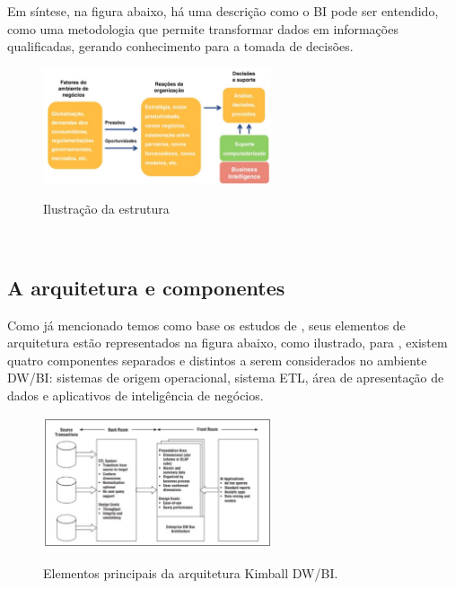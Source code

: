 Em s\'{i}ntese, na figura abaixo, h\'{a} uma descri\c{c}\~{a}o como o BI pode ser entendido, como uma metodologia que permite transformar dados em informa\c{c}\~{o}es qualificadas, gerando conhecimento para a tomada de decis\~{o}es.

\begin{figure}[H]
	\vspace*{0,2cm}
    \centering
    \caption{Ilustra\c{c}\~{a}o da estrutura}
    \includegraphics[width=0.6\textwidth]{./04-figuras/figura-01}
    \label{fig:ilustfig01}
\end{figure}
\vspace*{-0,9cm}
{\raggedright {}}\\

\subsection{A arquitetura e componentes}

Como j\'{a} mencionado temos como base os estudos de \cite{dw-kimball-2013}, seus elementos de arquitetura est\~{a}o representados na figura abaixo, como ilustrado, para \cite{dw-kimball-2013}, existem quatro componentes separados e distintos a serem considerados no ambiente DW/BI: sistemas de origem operacional, sistema ETL, \'{a}rea de apresenta\c{c}\~{a}o de dados e aplicativos de intelig\^{e}ncia de neg\'{o}cios.

\begin{figure}[H]
	\vspace*{0,2cm}
    \centering
    \caption{Elementos principais da arquitetura Kimball DW/BI.}
    \includegraphics[width=0.6\textwidth]{./04-figuras/figura-02}
    \label{fig:ilustfig02}
\end{figure}
\vspace*{-0,9cm}
{\raggedright {}}\\

